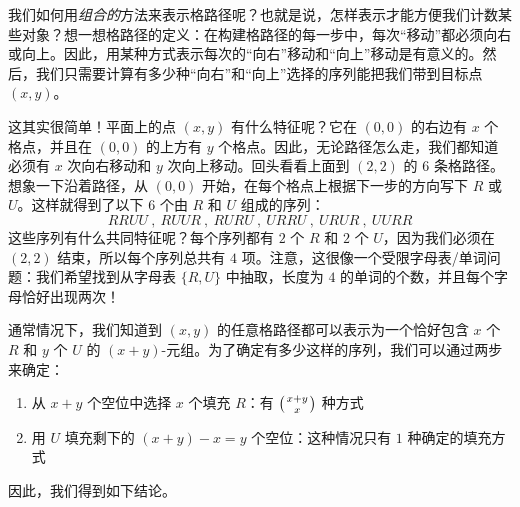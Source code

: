 \begin{example}
\begin{center}
    \end{center}
    我们如何用\emph{组合的}方法来表示格路径呢？也就是说，怎样表示才能方便我们计数某些对象？想一想格路径的定义：在构建格路径的每一步中，每次``移动''都必须向右或向上。因此，用某种方式表示每次的``向右''移动和``向上''移动是有意义的。然后，我们只需要计算有多少种``向右''和``向上''选择的序列能把我们带到目标点 $(x, y)$。

    这其实很简单！平面上的点 $(x, y)$ 有什么特征呢？它在 $(0, 0)$ 的右边有 $x$ 个格点，并且在 $(0, 0)$ 的上方有 $y$ 个格点。因此，无论路径怎么走，我们都知道必须有 $x$ 次向右移动和 $y$ 次向上移动。回头看看上面到 $(2, 2)$ 的 $6$ 条格路径。想象一下沿着路径，从 $(0, 0)$ 开始，在每个格点上根据下一步的方向写下 $R$ 或 $U$。这样就得到了以下 $6$ 个由 $R$ 和 $U$ 组成的序列：
    \[RRUU \:,\: RUUR \:,\: RURU \:,\: URRU \:,\: URUR \:,\: UURR\]
    这些序列有什么共同特征呢？每个序列都有 $2$ 个 $R$ 和 $2$ 个 $U$，因为我们必须在 $(2,2)$ 结束，所以每个序列总共有 $4$ 项。注意，这很像一个受限字母表/单词问题：我们希望找到从字母表 $\{R,U\}$ 中抽取，长度为 $4$ 的单词的个数，并且每个字母恰好出现两次！

    通常情况下，我们知道到 $(x, y)$ 的任意格路径都可以表示为一个恰好包含 $x$ 个 $R$ 和 $y$ 个 $U$ 的 $(x + y)$-元组。为了确定有多少这样的序列，我们可以通过两步来确定：
    \begin{enumerate}
        \item 从 $x + y$ 个空位中选择 $x$ 个填充 $R$：有 $\big({x+y \atop x}\big)$ 种方式
        \item 用 $U$ 填充剩下的 $(x + y) - x = y$ 个空位：这种情况只有 $1$ 种确定的填充方式
    \end{enumerate}
    因此，我们得到如下结论。


\end{example}

